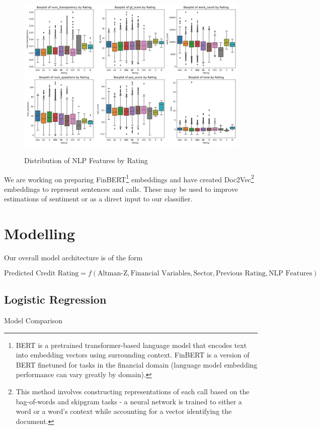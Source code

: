 \documentclass{article}[11pt]
\begin{document}
    \begin{figure}[h!]
		\centering
        \caption{Distribution of NLP Features by Rating}
        \includegraphics[width=0.6\linewidth,keepaspectratio=true]{../Output/hist_by_rating.png}
        \label{fig:dist-nlp-by-rating}
	\end{figure}

    We are working on preparing FinBERT\footnote{BERT is a pretrained transformer-based language model that encodes text into embedding vectors using surrounding context. FinBERT is a version of BERT finetuned for tasks in the financial domain (language model embedding performance can vary greatly by domain).} \citep{araci_finbert_2019} embeddings and have created Doc2Vec\footnote{This method involves constructing representations of each call based on the bag-of-words and skipgram tasks - a neural network is trained to either a word or a word's context while accounting for a vector identifying the document.} \citep{le_distributed_2014} embeddings to represent sentences and calls. These may be used to improve estimations of sentiment or as a direct input to our classifier.

    \section*{Modelling}

    Our overall model architecture is of the form

    \begin{equation*}
        \text{Predicted Credit Rating} = f(\text{Altman-Z}, \text{Financial Variables}, \text{Sector}, \text{Previous Rating}, \text{NLP Features})
    \end{equation*}

    \subsection*{Logistic Regression}

    \begin{table}[h!]
        \centering
        \caption{Model Comparison}
        
        \label{tab:model-comparison}
    \end{table}
\end{document}
